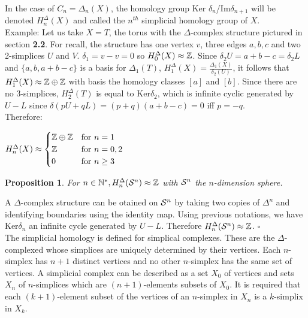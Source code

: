 \documentclass[12pt, a4paper]{article}
\newtheorem{proposition}{Proposition}
\newenvironment{proof}{{\sc Proof:}}{\hfill $\square$}
\begin{document}
In the case of $C_n = \Delta_n(X)$, the homology group Ker $\delta_n$/Im$\delta_{n+1}$ will be denoted $H^\Delta_n(X)$ and called the $n^{th}$ simplicial homology group of $X$. \\

Example: Let us take $X = T$, the torus with the $\Delta$-complex structure pictured in section \textbf{2.2}. For recall, the structure has one vertex $v$, three edges $a, b, c$ and two 2-simplices $U$ and $V$. $\delta_1 = v - v = 0$ so $H_0^\Delta(X) \approx \Z$. Since $\delta_2 U = a + b - c = \delta_2 L$ and $\{a, b, a+ b - c\}$ is a basis for $\Delta_1(T)$, $H_1^\Delta(X) = \frac{\Delta_1(X)}{\delta_2(U)}$, it follows that $H_1^\Delta(X) \approx \Z \oplus \Z$ with basis the homology classes $[a]$ and $[b]$. Since there are no 3-simplices, $H_2^\Delta(T)$ is equal to Ker$\delta_2$, which is infinite cyclic generated by $U-L$ since $\delta(pU+qL) = (p+q)(a+b-c) = 0$ iff $p = -q$.\\
Therefore:\\
\begin{center}
  $H_n^\Delta(X) \approx
  \begin{cases}
    \Z \oplus \Z &\text{for $n=1$}\\
    \Z &\text{for $n=0,2$}\\
    0 &\text{for $n\ge3$}
  \end{cases}$
\end{center}

\begin{proposition}
  For $n \in \N^*, H_n^\Delta(\S^n) \approx \Z$ with $\S^n$ the $n$-dimension sphere.
\end{proposition}
\begin{proof}
A $\Delta$-complex structure can be otained on $\S^n$ by taking two copies of $\Delta^n$ and identifying boundaries using the identity map. Using previous notations, we have Ker$\delta_n$ an infinite cycle generated by $U-L$. Therefore $H_n^\Delta(\S^n) \approx \Z$.
\end{proof}\\

The simplicial homology is defined for simplical complexes. These are the $\Delta$-complexed whose simplices are uniquely determined by their vertices. Each $n$-simplex has $n+1$ distinct vertices and no other $n$-simplex has the same set of vertices. A simplicial complex can be described as a set $X_0$ of vertices and sets $X_n$ of $n$-simplices which are $(n+1)$-elements subsets of $X_0$. It is required that each $(k+1)$-element subset of the vertices of an $n$-simplex in $X_n$ is a $k$-simplix in $X_k$.\\
\end{document}
